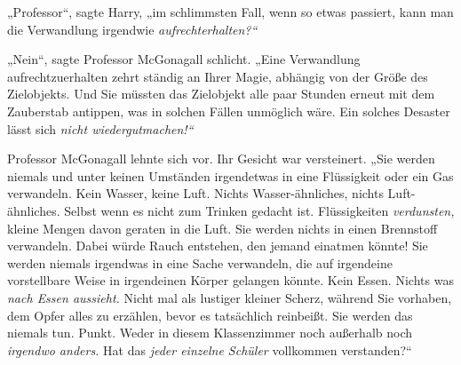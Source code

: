 „Professor“, sagte Harry, „im schlimmsten Fall, wenn so etwas passiert, kann man die Verwandlung irgendwie \emph{aufrechterhalten?“} 

„Nein“, sagte Professor McGonagall schlicht. „Eine Verwandlung aufrechtzuerhalten zehrt ständig an Ihrer Magie, abhängig von der Größe des Zielobjekts. Und Sie müssten das Zielobjekt alle paar Stunden erneut mit dem Zauberstab antippen, was in solchen Fällen unmöglich wäre. Ein solches Desaster lässt sich \emph{nicht wiedergutmachen!“} 

Professor McGonagall lehnte sich vor. Ihr Gesicht war versteinert. „Sie werden niemals und unter keinen Umständen irgendetwas in eine Flüssigkeit oder ein Gas verwandeln. Kein Wasser, keine Luft. Nichts Wasser-ähnliches, nichts Luft-ähnliches. Selbst wenn es nicht zum Trinken gedacht ist. Flüssigkeiten \emph{verdunsten,} kleine Mengen davon geraten in die Luft. Sie werden nichts in einen Brennstoff verwandeln. Dabei würde Rauch entstehen, den jemand einatmen könnte! Sie werden niemals irgendwas in eine Sache verwandeln, die auf irgendeine vorstellbare Weise in irgendeinen Körper gelangen könnte. Kein Essen. Nichts was \emph{nach Essen aussieht.} Nicht mal als lustiger kleiner Scherz, während Sie vorhaben, dem Opfer alles zu erzählen, bevor es tatsächlich reinbeißt. Sie werden das niemals tun. Punkt. Weder in diesem Klassenzimmer noch außerhalb noch \emph{irgendwo anders.} Hat das \emph{jeder einzelne Schüler} vollkommen verstanden?“

